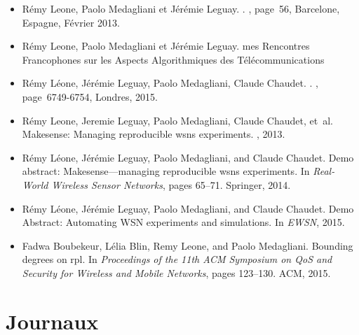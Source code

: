 \begin{itemize}
  \item Rémy Leone, Paolo Medagliani et Jérémie Leguay.
    .
    , page~56, Barcelone, Espagne, Février 2013.

  \item Rémy Leone, Paolo Medagliani et Jérémie Leguay.
    mes Rencontres Francophones sur les Aspects Algorithmiques des T{\'e}l{\'e}communications

  \item  Rémy Léone, Jérémie Leguay, Paolo Medagliani, Claude Chaudet.
    .
    , page~6749-6754, Londres, 2015.

  \item R{\'e}my Leone, Jeremie Leguay, Paolo Medagliani, Claude Chaudet, et~al.
\newblock Makesense: Managing reproducible wsns experiments.
, 2013.

  \item R{\'e}my L{\'e}one, J{\'e}r{\'e}mie Leguay, Paolo Medagliani, and Claude
  Chaudet.
\newblock Demo abstract: Makesense—managing reproducible wsns experiments.
\newblock In {\em Real-World Wireless Sensor Networks}, pages 65--71. Springer,
  2014.

  \item R{\'e}my L{\'e}one, J{\'e}r{\'e}mie Leguay, Paolo Medagliani, and Claude
  Chaudet.
\newblock Demo Abstract: Automating WSN experiments and simulations.
\newblock In {\em EWSN}, 2015.

	\item Fadwa Boubekeur, L{\'e}lia Blin, Remy Leone, and Paolo Medagliani.
\newblock Bounding degrees on rpl.
\newblock In {\em Proceedings of the 11th ACM Symposium on QoS and Security for
  Wireless and Mobile Networks}, pages 123--130. ACM, 2015.

\end{itemize}

\section*{Journaux}

